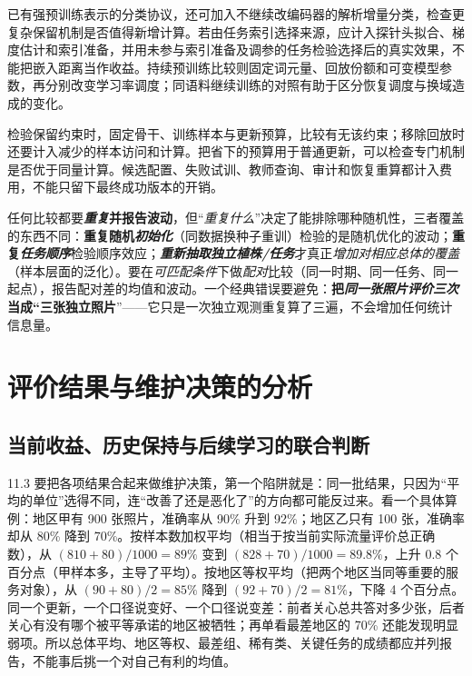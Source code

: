 已有强预训练表示的分类协议，还可加入不继续改编码器的解析增量分类，检查更复杂保留机制是否值得新增计算。若由任务索引选择来源，应计入探针头拟合、梯度估计和索引准备，并用未参与索引准备及调参的任务检验选择后的真实效果，不能把嵌入距离当作收益。持续预训练比较则固定词元量、回放份额和可变模型参数，再分别改变学习率调度；同语料继续训练的对照有助于区分恢复调度与换域造成的变化。

检验保留约束时，固定骨干、训练样本与更新预算，比较有无该约束；移除回放时还要计入减少的样本访问和计算。把省下的预算用于普通更新，可以检查专门机制是否优于同量计算。候选配置、失败试训、教师查询、审计和恢复重算都计入费用，不能只留下最终成功版本的开销。

任何比较都要\textbf{\emph{重复}并报告波动}，但“\emph{重复什么}”决定了能排除哪种随机性，三者覆盖的东西不同：\textbf{重复随机\emph{初始化}}（同数据换种子重训）检验的是随机优化的波动；\textbf{重复\emph{任务顺序}}检验顺序效应；\textbf{\emph{重新抽取\emph{独立植株/任务}}}才真正\emph{增加对相应总体的覆盖}（样本层面的泛化）。要在\emph{可匹配条件}下做\emph{配对}比较（同一时期、同一任务、同一起点），报告配对差的均值和波动。一个经典错误要避免：\textbf{把\emph{同一张照片评价三次}当成“三张独立照片}”——它只是一次独立观测重复算了三遍，不会增加任何统计信息量。

\section{评价结果与维护决策的分析}
\label{sec:ket-evolution-evaluation-analysis}

\subsection{当前收益、历史保持与后续学习的联合判断}
\label{sec:ket-evolution-evaluation-tradeoffs}

11.3 要把各项结果合起来做维护决策，第一个陷阱就是：同一批结果，只因为“平均的单位”选得不同，连“改善了还是恶化了”的方向都可能反过来。看一个具体算例：地区甲有 900 张照片，准确率从 90\% 升到 92\%；地区乙只有 100 张，准确率却从 80\% 降到 70\%。按样本数加权平均（相当于按当前实际流量评价总正确数），从 $(810+80)/1000=89\%$ 变到 $(828+70)/1000=89.8\%$，上升 0.8 个百分点（甲样本多，主导了平均）。按地区等权平均（把两个地区当同等重要的服务对象），从 $(90+80)/2=85\%$ 降到 $(92+70)/2=81\%$，下降 4 个百分点。同一个更新，一个口径说变好、一个口径说变差：前者关心总共答对多少张，后者关心有没有哪个被平等承诺的地区被牺牲；再单看最差地区的 70\% 还能发现明显弱项。所以总体平均、地区等权、最差组、稀有类、关键任务的成绩都应并列报告，不能事后挑一个对自己有利的均值。

